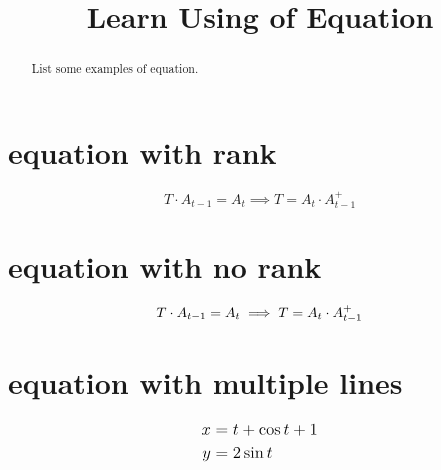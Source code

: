 \documentclass[a4paper]{article}
\begin{document}
    \title{Learn Using of Equation}
    \maketitle
    
    \begin{abstract}
        \vspace{20pt}
        {\large List some examples of equation.}
    \end{abstract}

    \section{equation with rank}
    \begin{equation}
        T \cdot A_{t-1}=A_t \implies T=A_t \cdot A_{t-1}^{+}
        \label{eq_pagerank}
    \end{equation}

    \section{equation with no rank}
    \begin{equation}
        T \cdot A_{t-1}=A_t \implies T=A_t \cdot A_{t-1}^{+}
        \notag%
    \end{equation}
    
    \section{equation with multiple lines}
    \begin{equation}
        {\large
        \begin{split}
            x &= t + \cos t +1\\
            y &= 2\sin t
        \end{split}}
    \end{equation}
        
    
\end{document}
